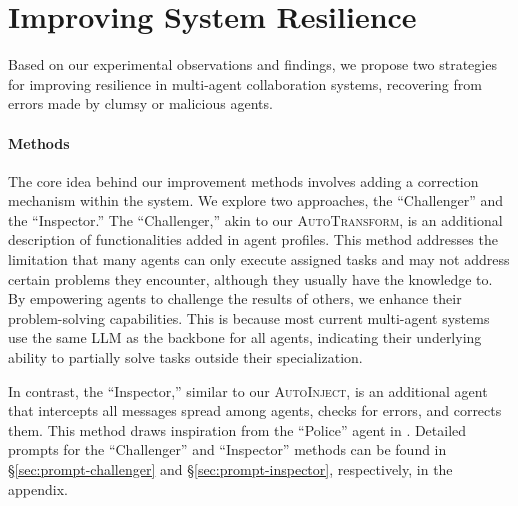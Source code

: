 \documentclass{article}
\theoremstyle{plain}
\theoremstyle{definition}
\theoremstyle{remark}
\begin{document}
\section{Improving System Resilience}
\label{sec:defense}

Based on our experimental observations and findings, we propose two strategies for improving resilience in multi-agent collaboration systems, recovering from errors made by clumsy or malicious agents.

\paragraph{Methods}

The core idea behind our improvement methods involves adding a correction mechanism within the system.
We explore two approaches, the ``Challenger'' and the ``Inspector.''
The ``Challenger,'' akin to our \textsc{AutoTransform}, is an additional description of functionalities added in agent profiles.
This method addresses the limitation that many agents can only execute assigned tasks and may not address certain problems they encounter, although they usually have the knowledge to.
By empowering agents to challenge the results of others, we enhance their problem-solving capabilities.
This is because most current multi-agent systems use the same LLM as the backbone for all agents, indicating their underlying ability to partially solve tasks outside their specialization.

In contrast, the ``Inspector,'' similar to our \textsc{AutoInject}, is an additional agent that intercepts all messages spread among agents, checks for errors, and corrects them.
This method draws inspiration from the ``Police'' agent in \citet{zhang2024psysafe}.
Detailed prompts for the ``Challenger'' and ``Inspector'' methods can be found in \S\ref{sec:prompt-challenger} and \S\ref{sec:prompt-inspector}, respectively, in the appendix.
\end{document}
